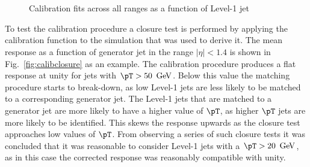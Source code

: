 \begin{figure}
{  }~ 
  \\
  ~ 
  \caption{Calibration fits across all \eta ranges as a function of
  Level-1 jet \pT}
  \label{fig:calibFunctions}
\end{figure}

To test the calibration procedure a closure test is performed by
applying the calibration function to the simulation that was
used to derive it. The mean response as a function of generator jet
\pT in the range  $|\eta|<1.4$ is shown in
Fig.~\ref{fig:calibclosure} as an example. The
calibration procedure produces a flat response at unity for jets with
$\pT>50~\gev$. Below this value the matching procedure starts to
break-down, as low \pT Level-1 jets are less likely to be matched to a
corresponding generator jet. The Level-1 jets that are matched to a
generator jet are more likely to have a higher value of $\pT$, as
higher $\pT$ jets are more likely to be identified. This skews the
response upwards as the closure test approaches low values of $\pT$.
From observing a series of such closure tests it was concluded that it
was reasonable to consider Level-1 jets with a $\pT>20~\gev$, as in
this case the corrected response was reasonably compatible with unity.


